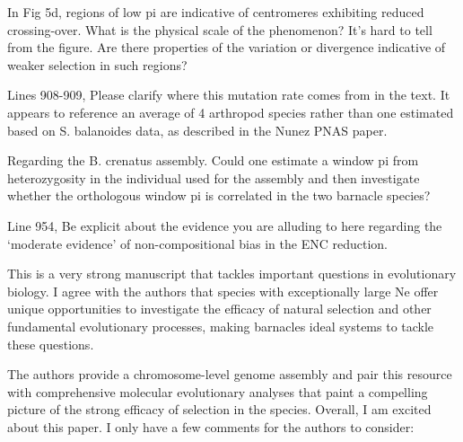\begin{point}{} %
In Fig 5d, regions of low pi are indicative of centromeres exhibiting
reduced crossing-over. What is the physical scale of the phenomenon? It's
hard to tell from the figure. Are there properties of the variation or
divergence indicative of weaker selection in such regions?
\end{point}


\begin{point}{} %
Lines 908-909, Please clarify where this mutation rate comes from in the
text. It appears to reference an average of 4 arthropod species rather
than one estimated based on S. balanoides data, as described in the Nunez
PNAS paper.
\end{point}


\begin{point}{} %
Regarding the B. crenatus assembly. Could one estimate a window pi from
heterozygosity in the individual used for the assembly and then
investigate whether the orthologous window pi is correlated in the two
barnacle species?
\end{point}


\begin{point}{} %
Line 954, Be explicit about the evidence you are alluding to here
regarding the `moderate evidence' of non-compositional bias in the ENC
reduction.
\end{point}




\begin{itquote}
This is a very strong manuscript that tackles important questions in
evolutionary biology. I agree with the authors that species with
exceptionally large Ne offer unique opportunities to investigate the
efficacy of natural selection and other fundamental evolutionary
processes, making barnacles ideal systems to tackle these questions.

The authors provide a chromosome-level genome assembly and pair this
resource with comprehensive molecular evolutionary analyses that paint a
compelling picture of the strong efficacy of selection in the species.
Overall, I am excited about this paper. I only have a few comments for
the authors to consider:
\end{itquote}

